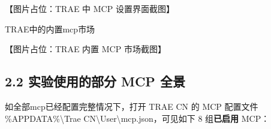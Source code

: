 \documentclass[
  american,
  chinese,
]{ctexart}
\begin{document}
{【图片占位：TRAE 中 MCP 设置界面截图】}

\foreignlanguage{american}{TRAE}{中的内置}{\foreignlanguage{american}{mcp}}{市场}%

{【图片占位：TRAE 内置 MCP 市场截图】}

\subsection{\texorpdfstring{\foreignlanguage{american}{2.2 }{实验使用的部分}\foreignlanguage{american}{ MCP }{全景}\foreignlanguage{american}{{~ }}}{2.2 实验使用的部分 MCP 全景~ }}\label{ux5b9eux9a8cux4f7fux7528ux7684ux90e8ux5206-mcp-ux5168ux666f}

{如全部}{\foreignlanguage{american}{mcp}}{已经配置完整情况下，}{\foreignlanguage{american}{打开}}\foreignlanguage{american}{ TRAE CN }\foreignlanguage{american}{的}\foreignlanguage{american}{ MCP }{\foreignlanguage{american}{配置文件}}\foreignlanguage{american}{ \%APPDATA\%\textbackslash Trae CN\textbackslash User\textbackslash{}{mcp.json{，可见如下}} 8 }{\foreignlanguage{american}{组\textbf{已启用}}}\foreignlanguage{american}{ MCP}\foreignlanguage{american}{：}
\end{document}
